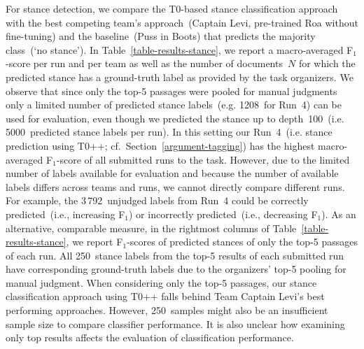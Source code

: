 
For stance detection, we compare the T0-based stance classification approach with the best competing team's approach~(Captain Levi, pre-trained Ro\Bert{}a without fine-tuning) and the baseline~(Puss in Boots) that predicts the majority class~(`no stance'). In Table~\ref{table-results-stance}, we report a macro-averaged F$_1$-score per run and per team as well as the number of documents~$N$ for which the predicted stance has a ground-truth label as provided by the task organizers. We observe that since only the top-5 passages were pooled for manual judgments only a limited number of predicted stance labels~(e.g. 1208~for Run~4) can be used for evaluation, even though we predicted the stance up to depth~100~(i.e. 5000~predicted stance labels per run). In this setting our Run~4~(i.e. stance prediction using T0++; cf.\ Section~\ref{argument-tagging}) has the highest macro-averaged F$_1$-score of all submitted runs to the task. However, due to the limited number of labels available for evaluation and because the number of available labels differs across teams and runs, we cannot directly compare different runs. For example, the 3\,792~unjudged labels from Run~4 could be correctly predicted~(i.e., increasing F$_1$) or incorrectly predicted~(i.e., decreasing F$_1$). As an alternative, comparable measure, in the rightmost columns of Table~\ref{table-results-stance}, we report F$_1$-scores of predicted stances of only the top-5 passages of each run. All 250~stance labels from the top-5 results of each submitted run have corresponding ground-truth labels due to the organizers' top-5 pooling for manual judgment.
When considering only the top-5 passages, our stance classification approach using T0++ falls behind Team Captain Levi's best performing approaches.
However, 250~samples might also be an insufficient sample size to compare classifier performance. It is also unclear how examining only top results affects the evaluation of classification performance.
